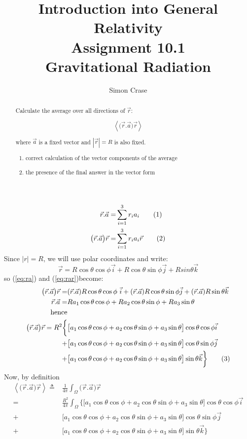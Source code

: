 \documentclass[]{article}
\title{Introduction into General Relativity\\Assignment 10.1\\Gravitational Radiation}
\author{Simon Crase}
\newcommand\numberthis{\addtocounter{equation}{1}\tag{\theequation}}
\begin{document}
\maketitle

\begin{abstract}
Calculate the average over all directions of $\vec{r}$:

$$\left\langle \big(\vec{r}.\vec{a}\big)\vec{r} \right\rangle$$

where $\vec{a}$ is a fixed vector and $|\vec{r}|=R$ is also fixed.
\begin{enumerate}
	\item correct calculation of the vector components of the average
	\item the presence of the final answer in the vector form
	

\end{enumerate}
\end{abstract}

\begin{align*}
\vec{r}.\vec{a} =& \sum_{i=1}^{3}r_ia_i\numberthis\label{eq:ra}\\
\big(\vec{r}.\vec{a}\big)\vec{r} =& \sum_{i=1}^{3}r_ia_i \vec{r} \numberthis\label{eq:rar}
\end{align*}
Since $|r|=R$, we will use polar coordinates and write:
$$\vec{r}=R\cos\theta\cos\phi\vec{i}+R\cos\theta\sin\phi\vec{j}+Rsin\theta\vec{k}$$
so (\ref{eq:ra}) and (\ref{eq:rar})become:
\begin{align*}
\big(\vec{r}.\vec{a}\big)\vec{r} =& (\vec{r}.\vec{a}) R \cos\theta\cos\phi\ \vec{i} + (\vec{r}.\vec{a})R\cos\theta\sin\phi  \vec{j} + (\vec{r}.\vec{a}) R\sin\theta \vec{k}\\
\vec{r}.\vec{a} =& Ra_1\cos\theta\cos\phi + Ra_2\cos\theta\sin\phi + Ra_3 \sin\theta\\
\text{hence}&\\
\big(\vec{r}.\vec{a}\big)\vec{r} = R^2 \bigg\{& \big[a_1\cos\theta\cos\phi + a_2\cos\theta\sin\phi + a_3 \sin\theta\big] \cos\theta\cos\phi\vec{i}\\ +& \big[a_1\cos\theta\cos\phi + a_2\cos\theta\sin\phi + a_3 \sin\theta\big]\cos\theta\sin\phi \vec{j}\\
 +& \big[a_1\cos\theta\cos\phi + a_2\cos\theta\sin\phi + a_3 \sin\theta\big] \sin\theta \vec{k}\bigg\}\numberthis \label{eq:rar_expanded}
\end{align*}
Now, by definition
\begin{align*}
\left\langle \big(\vec{r}.\vec{a}\big)\vec{r} \right\rangle \triangleq& \frac{1}{4\pi}\int_{\Omega}\big(\vec{r}.\vec{a}\big)\vec{r}\\
=&  \frac{ R^2}{4\pi}\int_{\Omega} \bigg\{ \big[a_1\cos\theta\cos\phi + a_2\cos\theta\sin\phi + a_3 \sin\theta\big] \cos\theta\cos\phi\vec{i}\\ +& \big[a_1\cos\theta\cos\phi + a_2\cos\theta\sin\phi + a_3 \sin\theta\big]\cos\theta\sin\phi \vec{j}\\
+& \big[a_1\cos\theta\cos\phi + a_2\cos\theta\sin\phi + a_3 \sin\theta\big] \sin\theta \vec{k}\bigg\}
\end{align*}
\end{document}

